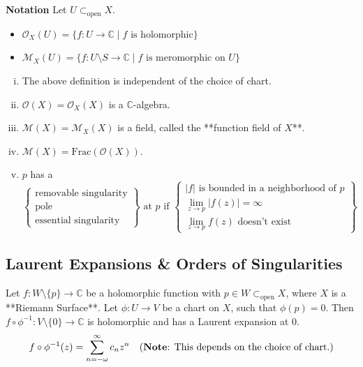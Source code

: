 \documentclass{article}
\begin{document}
\textbf{Notation}
Let $U \subset_{\text{open}} X$.
\begin{itemize}
    \item $\mathcal{O}_X(U) = \{f: U \to \mathbb{C} \mid f \text{ is holomorphic}\}$
    \item $\mathcal{M}_X(U) = \{f: U \setminus S \to \mathbb{C} \mid f \text{ is meromorphic on } U\}$
\end{itemize}

\begin{lemma}
\begin{enumerate}[i)]
    \item The above definition is independent of the choice of chart.
    \item $\mathcal{O}(X) = \mathcal{O}_X(X)$ is a $\mathbb{C}$-algebra.
    \item $\mathcal{M}(X) = \mathcal{M}_X(X)$ is a field, called the **function field of $X$**.
    \item $\mathcal{M}(X) = \text{Frac}(\mathcal{O}(X))$.
    \item $p$ has a
    $$
    \left\{
    \begin{array}{l}
    \text{removable singularity} \\
    \text{pole} \\
    \text{essential singularity}
    \end{array}
    \right\} \text{ at } p \text{ if }
    \left\{
    \begin{array}{l}
    |f| \text{ is bounded in a neighborhood of } p \\
    \lim_{z \to p} |f(z)| = \infty \\
    \lim_{z \to p} f(z) \text{ doesn't exist}
    \end{array}
    \right\}
    $$
\end{enumerate}
\end{lemma}

\subsection{Laurent Expansions \& Orders of Singularities}
Let $f: W \setminus \{p\} \to \mathbb{C}$ be a holomorphic function with $p \in W \subset_{\text{open}} X$, where $X$ is a **Riemann Surface**.
Let $\phi: U \to V$ be a chart on $X$, such that $\phi(p) = 0$.
Then $f \circ \phi^{-1}: V \setminus \{0\} \to \mathbb{C}$ is holomorphic and has a Laurent expansion at $0$.
$$
f \circ \phi^{-1}(z) = \sum_{n = -\omega}^{\infty} c_n z^n \quad \text{(\textbf{Note}: This depends on the choice of chart.)}
$$
\end{document}
